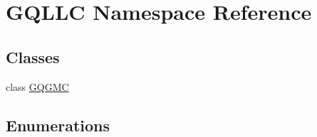 \hypertarget{namespace_g_q_l_l_c}{\section{\-G\-Q\-L\-L\-C \-Namespace \-Reference}
\label{namespace_g_q_l_l_c}
}
\subsection*{\-Classes}
\begin{DoxyCompactItemize}
\item 
class \hyperlink{class_g_q_l_l_c_1_1_g_q_g_m_c}{\-G\-Q\-G\-M\-C}
\end{DoxyCompactItemize}
\subsection*{\-Enumerations}
